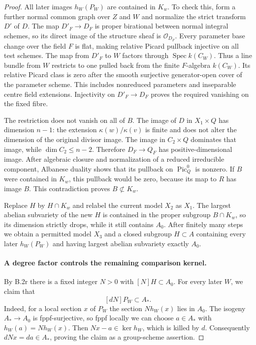 \begin{proof}
All later images $h_W(P_W)$ are contained in $K_w$.
To check this, form a further normal common graph over $Z$
and $W$ and normalize the strict transform $D'$ of $D$.
The map $D'_F\to D_F$ is proper birational between normal
integral schemes, so its direct image of the structure sheaf
is $\mathcal O_{D_F}$.  Every parameter base change over the
field $F$ is flat, making relative Picard pullback injective
on all test schemes.  The map from $D'_F$ to $W$ factors
through $\operatorname{Spec}k(C_W)$.
Thus a line bundle from $W$ restricts to one pulled back
from the finite $F$-algebra $k(C_W)$.
Its relative Picard class is zero after the smooth
surjective generator-open cover of the parameter scheme.
This includes nonreduced parameters and inseparable centre
field extensions.  Injectivity on $D'_F\to D_F$ proves the
required vanishing on the fixed fibre.

The restriction does not vanish on all of $B$.
The image of $D$ in $X_1\times Q$ has dimension $n-1$:
the extension $\kappa(w)/\kappa(v)$ is finite and does not
alter the dimension of the original divisor image.
The image in $C_2\times Q$ dominates that image, while
$\dim C_2\le n-2$.
Therefore $D_F\to Q_F$ has positive-dimensional image.
After algebraic closure and normalization of a reduced
irreducible component, Albanese duality shows that its
pullback on $\operatorname{Pic}^0_Q$ is nonzero.
If $B$ were contained in $K_w$, this pullback would be zero,
because its map to $R$ has image $B$.  This contradiction
proves $B\not\subset K_w$.

Replace $H$ by $H\cap K_w$ and relabel the current model
$X_2$ as $X_1$.  The largest abelian subvariety of the new
$H$ is contained in the proper subgroup $B\cap K_w$, so
its dimension strictly drops, while it still contains $A_0$.
After finitely many steps we obtain a permitted model $X_3$
and a closed subgroup $H\subset A$ containing every later
$h_W(P_W)$ and having largest abelian subvariety exactly $A_0$.

\paragraph{A degree factor controls the remaining comparison kernel.}
By B.2r there is a fixed integer $N>0$ with
$[N]H\subset A_0$.
For every later $W$, we claim that
\[
                         [dN]P_W\subset A_*.
\]
Indeed, for a local section $x$ of $P_W$ the section
$N h_W(x)$ lies in $A_0$.
The isogeny $A_*\to A_0$ is fppf-surjective, so fppf locally
we can choose $a\in A_*$ with $h_W(a)=N h_W(x)$.
Then $Nx-a\in\ker h_W$, which is killed by $d$.
Consequently $dNx=da\in A_*$, proving the claim as a
group-scheme assertion.


\end{proof}
